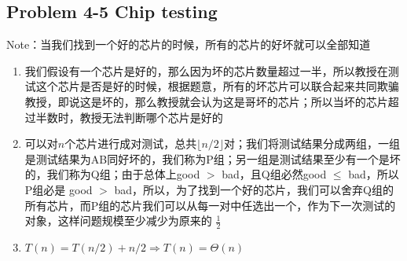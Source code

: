 \subsection*{Problem 4-5 Chip testing}
Note：当我们找到一个好的芯片的时候，所有的芯片的好坏就可以全部知道
\begin{enumerate}
	\item	我们假设有一个芯片是好的，那么因为坏的芯片数量超过一半，所以教授在测试这个芯片是否是好的时候，根据题意，所有的坏芯片可以联合起来共同欺骗教授，即说这是坏的，那么教授就会认为这是哥坏的芯片；所以当坏的芯片超过半数时，教授无法判断哪个芯片是好的
	\item	可以对$n$个芯片进行成对测试，总共$\lfloor n/2 \rfloor$对；我们将测试结果分成两组，一组是测试结果为AB同好坏的，我们称为P组；另一组是测试结果至少有一个是坏的，我们称为Q组；由于总体上good $>$ bad，且Q组必然good $\leq$ bad，所以P组必是 good $>$ bad，所以，为了找到一个好的芯片，我们可以舍弃Q组的所有芯片，而P组的芯片我们可以从每一对中任选出一个，作为下一次测试的对象，这样问题规模至少减少为原来的 $\frac{1}{2}$
	\item	$T(n)=T(n/2)+n/2 \Rightarrow T(n)=\Theta(n)$
\end{enumerate}

